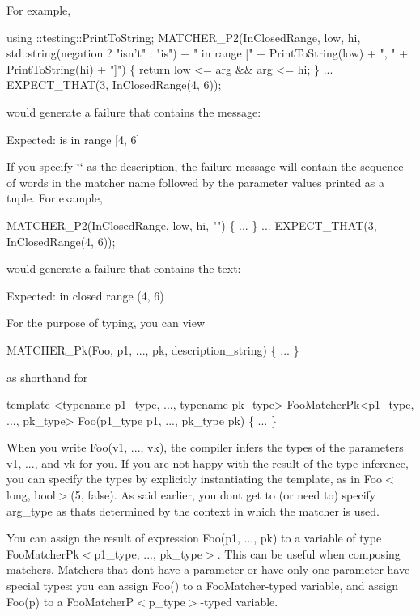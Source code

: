 For example, 
\begin{DoxyCode}
using ::testing::PrintToString;
MATCHER\_P2(InClosedRange, low, hi,
           std::string(negation ? "isn't" : "is") + " in range [" +
           PrintToString(low) + ", " + PrintToString(hi) + "]") \{
  return low <= arg && arg <= hi;
\}
...
EXPECT\_THAT(3, InClosedRange(4, 6));
\end{DoxyCode}
 would generate a failure that contains the message\+: 
\begin{DoxyCode}
Expected: is in range [4, 6]
\end{DoxyCode}


If you specify {\ttfamily \char`\"{}\char`\"{}} as the description, the failure message will contain the sequence of words in the matcher name followed by the parameter values printed as a tuple. For example, 
\begin{DoxyCode}
MATCHER\_P2(InClosedRange, low, hi, "") \{ ... \}
...
EXPECT\_THAT(3, InClosedRange(4, 6));
\end{DoxyCode}
 would generate a failure that contains the text\+: 
\begin{DoxyCode}
Expected: in closed range (4, 6)
\end{DoxyCode}


For the purpose of typing, you can view 
\begin{DoxyCode}
MATCHER\_Pk(Foo, p1, ..., pk, description\_string) \{ ... \}
\end{DoxyCode}
 as shorthand for 
\begin{DoxyCode}
template <typename p1\_type, ..., typename pk\_type>
FooMatcherPk<p1\_type, ..., pk\_type>
Foo(p1\_type p1, ..., pk\_type pk) \{ ... \}
\end{DoxyCode}


When you write {\ttfamily Foo(v1, ..., vk)}, the compiler infers the types of the parameters {\ttfamily v1}, ..., and {\ttfamily vk} for you. If you are not happy with the result of the type inference, you can specify the types by explicitly instantiating the template, as in {\ttfamily Foo$<$long, bool$>$(5, false)}. As said earlier, you don\textquotesingle{}t get to (or need to) specify {\ttfamily arg\+\_\+type} as that\textquotesingle{}s determined by the context in which the matcher is used.

You can assign the result of expression {\ttfamily Foo(p1, ..., pk)} to a variable of type {\ttfamily Foo\+Matcher\+Pk$<$p1\+\_\+type, ..., pk\+\_\+type$>$}. This can be useful when composing matchers. Matchers that don\textquotesingle{}t have a parameter or have only one parameter have special types\+: you can assign {\ttfamily Foo()} to a {\ttfamily Foo\+Matcher}-\/typed variable, and assign {\ttfamily Foo(p)} to a {\ttfamily Foo\+MatcherP$<$p\+\_\+type$>$}-\/typed variable.

